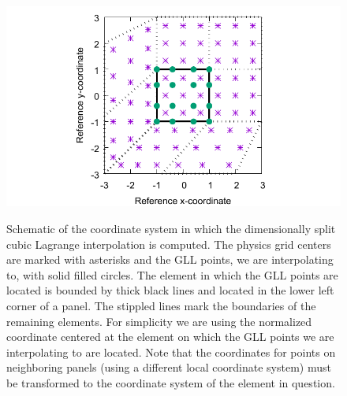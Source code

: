 \documentclass[twocol]{ametsoc}
\begin{document}
\begin{figure}[t]
\noindent\includegraphics[width=37pc,angle=0]{figs/mapping/mapping.pdf}\\
\caption{Schematic of the coordinate system in which the dimensionally split cubic Lagrange interpolation is computed.  The physics grid centers are marked with asterisks and the GLL points, we are interpolating to, with solid filled circles. The element in which the GLL points are located is  bounded by  thick black lines and located in the lower left corner of a panel. The stippled lines mark the boundaries of the remaining elements. For simplicity we are using the normalized coordinate centered at the element on which the GLL points we are interpolating to are located. Note that the coordinates for points on neighboring panels (using a different local coordinate system) must be transformed to the coordinate system of the element in question.}
\label{fig:mapping}
\end{figure}




\end{document}

